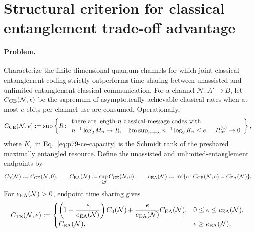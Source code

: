 \section{Structural criterion for classical--entanglement trade-off advantage}
\label{sec:op_ad12295d8fdfb02a}

\paragraph{Problem.}
Characterize the finite-dimensional quantum channels for which joint
classical--entanglement coding strictly outperforms time sharing between
unassisted and unlimited-entanglement classical communication.  For a channel
$\mathcal N:A'\to B$, let $C_{\rm CE}(\mathcal N,e)$ be the supremum of
asymptotically achievable classical rates when at most $e$ ebits per channel
use are consumed.  Operationally,
\begin{equation}
  C_{\rm CE}(\mathcal N,e)
  :=\sup\left\{
    R:\begin{array}{l}
      \text{there are length-$n$ classical-message codes with}\\
      n^{-1}\log_2M_n\to R,\quad
      \limsup_{n\to\infty}n^{-1}\log_2K_n\leq e,\quad
      P_{\rm err}^{(n)}\to0
    \end{array}
  \right\},
  \label{eq:p79-ce-capacity}
\end{equation}
where $K_n$ in Eq.~\eqref{eq:p79-ce-capacity} is the Schmidt rank of the
preshared maximally entangled resource.  Define the unassisted and
unlimited-entanglement endpoints by
\begin{equation}
  C_0(\mathcal N):=C_{\rm CE}(\mathcal N,0),
  \qquad
  C_{\rm EA}(\mathcal N):=\sup_{e\geq0}C_{\rm CE}(\mathcal N,e),
  \qquad
  e_{\rm EA}(\mathcal N)
    :=\inf\{e:C_{\rm CE}(\mathcal N,e)=C_{\rm EA}(\mathcal N)\}.
  \label{eq:p79-ce-endpoints}
\end{equation}
For $e_{\rm EA}(\mathcal N)>0$, endpoint time sharing gives
\begin{equation}
  C_{\rm TS}(\mathcal N,e)
  :=\begin{cases}
    \left(1-\dfrac{e}{e_{\rm EA}(\mathcal N)}\right)C_0(\mathcal N)
    +\dfrac{e}{e_{\rm EA}(\mathcal N)}C_{\rm EA}(\mathcal N),
      &0\leq e\leq e_{\rm EA}(\mathcal N),\\[2mm]
    C_{\rm EA}(\mathcal N),&e\geq e_{\rm EA}(\mathcal N).
  \end{cases}
  \label{eq:p79-time-sharing-curve}
\end{equation}
